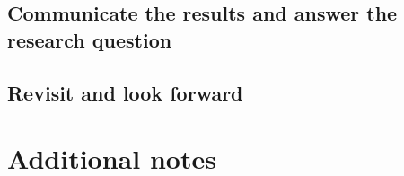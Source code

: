 \documentclass[
]{report}
\begin{document}
\hypertarget{communicate-the-results-and-answer-the-research-question}{%
\subsection{Communicate the results and answer the research question}\label{communicate-the-results-and-answer-the-research-question}}

\hypertarget{revisit-and-look-forward}{%
\subsection{Revisit and look forward}\label{revisit-and-look-forward}}

\hypertarget{additional-notes}{%
\section{Additional notes}\label{additional-notes}}
\end{document}
